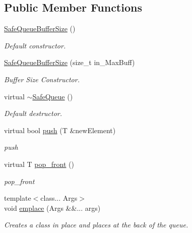 \subsection*{Public Member Functions}
\begin{DoxyCompactItemize}
\item 
\mbox{\hyperlink{classSafeContainers_1_1SafeQueueBufferSize_aa32dc6697399fc6caf5daeae487d552d}{Safe\+Queue\+Buffer\+Size}} ()
\begin{DoxyCompactList}\small\item\em Default constructor. \end{DoxyCompactList}\item 
\mbox{\hyperlink{classSafeContainers_1_1SafeQueueBufferSize_aea60f2d6f74622e15518def00a1838a6}{Safe\+Queue\+Buffer\+Size}} (size\+\_\+t in\+\_\+\+Max\+Buff)
\begin{DoxyCompactList}\small\item\em Buffer Size Constructor. \end{DoxyCompactList}\item 
\mbox{\label{classSafeContainers_1_1SafeQueueBufferSize_a44422311c9f5ba1652b09a38c85b9c01}} 
virtual \mbox{\hyperlink{classSafeContainers_1_1SafeQueueBufferSize_a44422311c9f5ba1652b09a38c85b9c01}{$\sim$\+Safe\+Queue}} ()
\begin{DoxyCompactList}\small\item\em Default destructor. \end{DoxyCompactList}\item 
virtual bool \mbox{\hyperlink{classSafeContainers_1_1SafeQueueBufferSize_ae807868ecb6d9d052460d3e672465902}{push}} (T \&new\+Element)
\begin{DoxyCompactList}\small\item\em push \end{DoxyCompactList}\item 
virtual T \mbox{\hyperlink{classSafeContainers_1_1SafeQueueBufferSize_ad79da418fbe0e89212c3cecf69dbe43a}{pop\+\_\+front}} ()
\begin{DoxyCompactList}\small\item\em pop\+\_\+front \end{DoxyCompactList}\item 
{\footnotesize template$<$class... Args$>$ }\\void \mbox{\hyperlink{classSafeContainers_1_1SafeQueueBufferSize_ad96ffce7d2637737515882c3da0274ee}{emplace}} (Args \&\&... args)
\begin{DoxyCompactList}\small\item\em Creates a class in place and places at the back of the queue. \end{DoxyCompactList}\item 

\end{DoxyCompactItemize}
